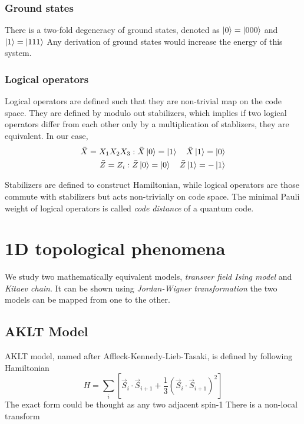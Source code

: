 \documentclass[12pt,a4paper]{article}
\numberwithin{equation}{section}
\begin{document}
\subsubsection*{Ground states}
There is a two-fold degeneracy of ground states, denoted as $\ket{0}=\ket{000}$ and $\ket{1}=\ket{111}$
Any derivation of ground states would increase the energy of this system.

\subsubsection*{Logical operators}
Logical operators are defined such that they are non-trivial map on the code space. They are defined by modulo out 
stabilizers, which implies if two logical operators differ from each other only by a multiplication of stablizers, they are
equivalent. In our case,
\begin{equation}
    \begin{aligned}
        \bar{X} = X_1X_2X_3 : \bar{X}\ket{0} = \ket{1} \quad \bar{X}\ket{1} = \ket{0} \\
        \bar{Z} = Z_i : \bar{Z}\ket{0} = \ket{0} \quad \bar{Z}\ket{1} = -\ket{1}\\
    \end{aligned}
\end{equation}

\begin{tcolorbox}[title = {A brief summary}]
    Stabilizers are defined to construct Hamiltonian, while logical operators are those commute with stabilizers but acts non-trivially
    on code space. The minimal Pauli weight of logical operators is called \textit{code distance} of a quantum code.
\end{tcolorbox}


\section{1D topological phenomena}

We study two mathematically equivalent models, \textit{transver field Ising model} and \textit{Kitaev chain}.
It can be shown using \textit{Jordan-Wigner transformation} the two models can be mapped from one to the other.


\subsection{AKLT Model}

AKLT model, named after Affleck-Kennedy-Lieb-Tasaki, is defined by following Hamiltonian
\begin{equation}
    H = \sum_i\left[\vec{S}_i\cdot\vec{S}_{i+1} + \frac{1}{3} (\vec{S}_i\cdot\vec{S}_{i+1})^2\right]
\end{equation}
The exact form could be thought as any two adjacent spin-1 
There is a non-local transform
\end{document}
